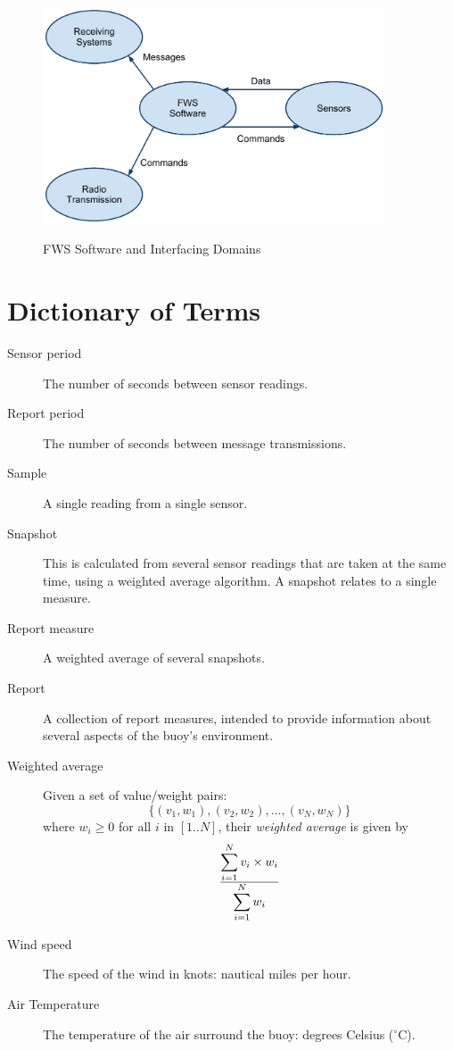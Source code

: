 \documentclass[letterpaper,11pt]{article}
\newcounter{type}
\newcounter{item}[type]
\begin{document}
\begin{figure}[h]
  \centering
  \includegraphics[width=4in]{FWSInterfacingDomains.pdf}
  \label{fig:iface}
  \caption{FWS Software and Interfacing Domains}
\end{figure}

\section{Dictionary of Terms}

\begin{description}
\item[Sensor period] The number of seconds between sensor readings.
\item[Report period] The number of seconds between message transmissions.
\item[Sample] A single reading from a single sensor.
\item[Snapshot] This is calculated from several sensor readings that are taken
  at the same time, using a weighted average algorithm.  A snapshot relates to
  a single measure.
\item[Report measure] A weighted average of several snapshots.
\item[Report] A collection of report measures, intended to provide information
  about several aspects of the buoy's environment.
\item[Weighted average] Given a set of value/weight pairs:
  \begin{displaymath}
    \lbrace (v_1,w_1), (v_2,w_2), \ldots, (v_N,w_N) \rbrace
  \end{displaymath}
  where $w_i \geq 0$ for all $i$ in $[1..N]$, their \textit{weighted average}
  is given by
  \begin{displaymath}
    {\displaystyle\sum_{i=1}^N v_i \times w_i}
    \over
    {\displaystyle\sum_{i=1}^N w_i}
    \nonumber
  \end{displaymath}
\item[Wind speed] The speed of the wind in knots: nautical miles per hour.
\item[Air Temperature] The temperature of the air surround the buoy: degrees
  Celsius ($^{\circ}$C).
\end{description}
\end{document}
